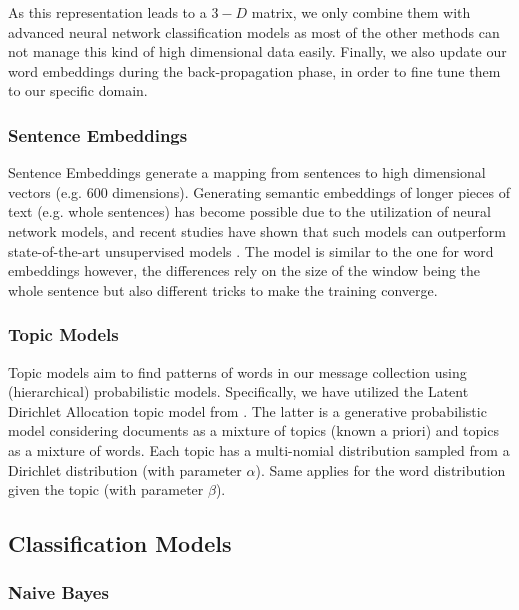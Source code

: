 \documentclass[letterpaper]{article}
\begin{document}
As this representation leads to a $3-D$ matrix, we only combine them with advanced neural network classification models as most of the other methods can not manage this kind of high dimensional data easily. Finally, we also update our word embeddings during the back-propagation phase, in order to fine tune them to our specific domain.

\subsubsection{Sentence Embeddings}  \label{Sentence Embeddings}

Sentence Embeddings generate a mapping from sentences to high dimensional vectors (e.g. $600$ dimensions). Generating semantic embeddings of longer pieces of text (e.g. whole sentences) has become possible due to the utilization of neural network models, and recent studies have shown that such models can outperform state-of-the-art unsupervised models \cite{pagliardini2017unsupervised}. The model is similar to the one for word embeddings however, the differences rely on the size of the window being the whole sentence but also different tricks to make the training converge.

\subsubsection{Topic Models}  \label{Topics}

Topic models aim to find patterns of words in our message collection using (hierarchical) probabilistic models. Specifically, we have utilized the Latent Dirichlet Allocation topic model from \cite{blei2006dynamic}. The latter is a generative probabilistic model considering documents as a mixture of topics (known a priori) and topics as a mixture of words. Each topic has a multi-nomial distribution sampled from a Dirichlet distribution (with parameter $\alpha$). Same applies for the word distribution given the topic (with parameter $\beta$).

\subsection{Classification Models}  \label{Classification}

\subsubsection{Naive Bayes}  \label{Naive Bayes}
\end{document}
